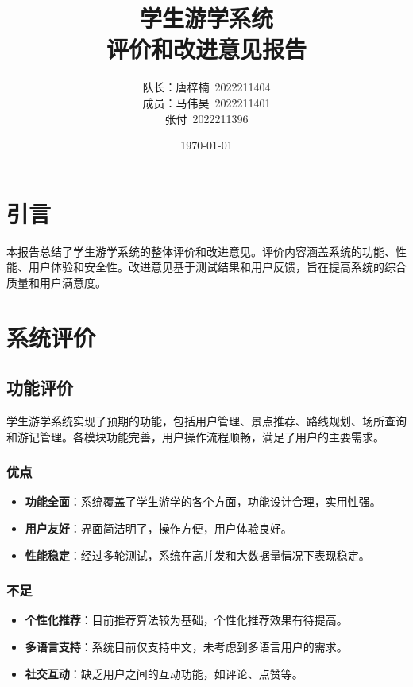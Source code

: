 \documentclass{ctexart}
\title{学生游学系统 \\ 评价和改进意见报告}
\author{队长：唐梓楠\ 2022211404 \\ 成员：马伟昊\ 2022211401 \\ 张付\ 2022211396}
\date{\today}
\begin{document}
\maketitle

\tableofcontents

\newpage

\section{引言}
本报告总结了学生游学系统的整体评价和改进意见。评价内容涵盖系统的功能、性能、用户体验和安全性。改进意见基于测试结果和用户反馈，旨在提高系统的综合质量和用户满意度。

\section{系统评价}

\subsection{功能评价}
学生游学系统实现了预期的功能，包括用户管理、景点推荐、路线规划、场所查询和游记管理。各模块功能完善，用户操作流程顺畅，满足了用户的主要需求。

\subsubsection{优点}
\begin{itemize}
    \item \textbf{功能全面}：系统覆盖了学生游学的各个方面，功能设计合理，实用性强。
    \item \textbf{用户友好}：界面简洁明了，操作方便，用户体验良好。
    \item \textbf{性能稳定}：经过多轮测试，系统在高并发和大数据量情况下表现稳定。
\end{itemize}

\subsubsection{不足}
\begin{itemize}
    \item \textbf{个性化推荐}：目前推荐算法较为基础，个性化推荐效果有待提高。
    \item \textbf{多语言支持}：系统目前仅支持中文，未考虑到多语言用户的需求。
    \item \textbf{社交互动}：缺乏用户之间的互动功能，如评论、点赞等。
\end{itemize}
\end{document}
